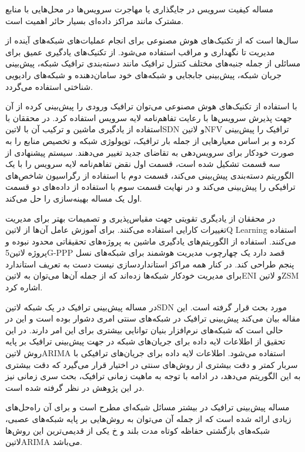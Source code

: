 
مساله کیفیت سرویس در جایگذاری یا مهاجرت سرویس‌ها در محل‌هایی با منابع مشترک مانند مراکز داده‌ای بسیار حائر اهمیت است.


سال‌ها است که از تکنیک‌های هوش مصنوعی برای انجام عملیات‌های شبکه‌های آینده از مدیریت تا نگهداری و مراقب استفاده می‌شود. از تکنیک‌های یادگیری عمیق
برای مسائلی از جمله جنبه‌های مختلف کنترل ترافیک مانند دسته‌بندی ترافیک شبکه، پیش‌بینی جریان شبکه، پیش‌بینی جابجایی
و شبکه‌های خود سامان‌دهنده و شبکه‌های رادیویی شناختی
استفاده می‌گردد. 

با استفاده از تکنیک‌های هوش مصنوعی می‌توان ترافیک ورودی را پیش‌بینی کرده از آن جهت پذیرش سرویس‌ها با رعایت تفاهم‌نامه لایه سرویس استفاده کرد. 
در  محققان با استفاده از یادگیری ماشین و ترکیب آن با ‌لاتین{SDN} و ‌لاتین{NFV} ترافیک را پیش‌بینی کرده و بر اساس معیارهایی از جمله بار ترافیک،
توپولوژی شبکه و تخصیص منابع را به صورت خودکار برای سرویس‌دهی به تقاضای جدید تغییر می‌دهند. سیستم پیشنهادی  از سه قسمت تشکیل شده است، قسمت اول
نقض تفاهم‌نامه لایه سرویس را با یک الگوریتم دسته‌بندی پیش‌بینی می‌کند، قسمت دوم با استفاده از رگراسیون شاخص‌های ترافیکی را پیش‌بینی می‌کند و در نهایت قسمت سوم با استفاده از
داده‌های دو قسمت اول یک مساله بهینه‌سازی را حل می‌کند.

در  محققان از یادیگری تقویتی جهت مقیاس‌پذیری و تصمیمات بهتر برای مدیریت تغییرات کارایی استفاده می‌کنند. برای آموزش عامل آن‌ها از ‌لاتین{Q Learning}
استفاده می‌کنند. استفاده از الگوریتم‌های یادگیری ماشین به پروژه‌های تحقیقاتی محدود نبوده و پروژه ‌لاتین{5G-PPP} قصد دارد یک چهارچوب مدیریت هوشمند برای شبکه‌های نسل پنجم
طراحی کند. در کنار همه مراکز استانداردسازی نیست دست به تعریف استاندارد برای مدیریت خودکار شبکه‌ها زده‌اند که از جمله آن‌ها می‌توان به ‌لاتین{ENI} و ‌لاتین{ZSM} اشاره کرد.

در  مساله پیش‌بینی ترافیک در یک شبکه ‌لاتین{SDN} مورد بحث قرار گرفته است. این مقاله بیان می‌کند پیش‌بینی ترافیک در
شبکه‌های سنتی امری دشوار بوده است و این در حالی است که شبکه‌های نرم‌افزار بنیان توانایی بیشتری برای این امر دارند. در این تحقیق از اطلاعات لایه
داده برای جریان‌های شبکه در جهت پیش‌بینی ترافیک بر پایه روش ‌لاتین{ARIMA} استفاده می‌شود.
اطلاعات لایه داده برای جریان‌های ترافیکی با سربار کمتر و دقت بیشتری از روش‌های سنتی در اختیار قرار می‌گیرد که دقت بیشتری به این الگوریتم می‌دهد،
در ادامه با توجه به ماهیت زمانی ترافیک، بحث سری زمانی نیز در این پژوهش در نظر گرفته شده است.

مساله پیش‌بینی ترافیک در بیشتر مسائل شبکه‌ای مطرح است و برای آن راه‌حل‌های زیادی ارائه شده است که از جمله آن می‌توان به روش‌هایی بر پایه شبکه‌های عصبی،
شبکه‌های بازگشتی حفاظه کوتاه مدت بلند و ‌خ
یکی از قدیمی‌ترین این روش‌ها ‌لاتین{ARIMA} می‌باشد.
